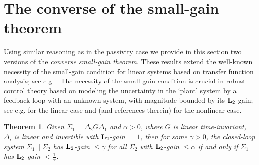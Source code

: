 \documentclass[11pt]{article}
\newtheorem{thm}[lemma]{Theorem}
\newcommand{\Ltwo}{\boldsymbol{\rm L}_{2}}
\begin{document}





\section{The converse of the small-gain theorem}

Using similar reasoning as in the passivity case we provide in this section two versions of the {\it converse small-gain theorem}. These results extend the well-known necessity of the small-gain condition for linear systems based on transfer function analysis;
see e.g. \cite{ZDG}. The necessity of the small-gain condition is crucial in robust control theory based on modeling the uncertainty in the `plant'
system by a feedback loop with an unknown system, with magnitude bounded by its $\Ltwo$-gain; see e.g. \cite{ZDG} for the linear case and \cite{Sch17}
(and references therein) for the nonlinear case.

\begin{thm} \label{thm: smallgain} Given $\Sigma_1 = \Delta_2 G \Delta_1$ and $\alpha >0$, where $G$ is linear time-invariant, $\Delta_i$ is linear
  and invertible with $\Ltwo$-gain $= 1$, then for some $\gamma >0$, the closed-loop system $\Sigma_1 \| \Sigma_2$ has $\Ltwo$-gain $\leq \gamma$ for
  all $\Sigma_2$ with $\Ltwo$-gain $\leq \alpha$ if and only if $\Sigma_1$ has $\Ltwo$-gain $ < \frac{1}{\alpha}$.
\end{thm}
\end{document}
